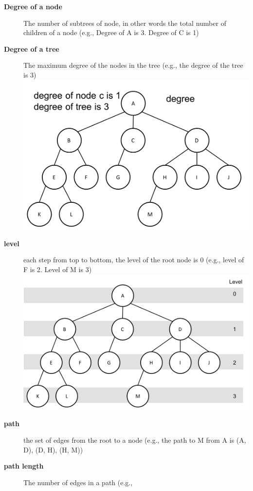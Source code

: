 \documentclass[newPxFont,sthlmFooter,nooffset]{beamer}
\begin{document}
\begin{frame}[t, allowframebreaks]
\begin{description}
  \item[\textbf{Degree of a node}] The number of subtrees of node, in
    other words the total number of children of a node (e.g., Degree
    of A is 3. Degree of C is 1)
  \item[\textbf{Degree of a tree}] The maximum degree of the nodes in
    the tree (e.g., the degree of the tree is 3)\\
\includegraphics[height=0.3\textheight]{./figures/fig02_def_degree.png}
  \item[\textbf{level}] each step from top to bottom, the level of the
    root node is 0 (e.g., level of F is 2. Level of M is 3)\\
\includegraphics[height=0.3\textheight]{./figures/fig02_def_level.png}
  \item[\textbf{path}] the set of edges from the root to a node (e.g.,
    the path to M from A is (A, D), (D, H), (H, M))
  \item[\textbf{path length}] The number of edges in a path (e.g.,

\end{description}
\end{frame}
\end{document}
